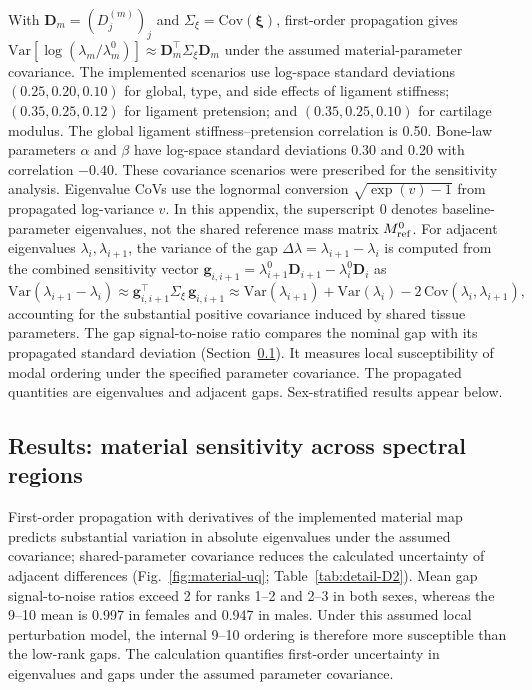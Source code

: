 \documentclass[pdflatex,sn-basic]{sn-jnl}
\begin{document}
With $\mathbf D_m=(D_j^{(m)})_j$ and $\Sigma_{\xi}=\mathrm{Cov}(\boldsymbol\xi)$, first-order propagation gives $\mathrm{Var}[\log(\lambda_m/\lambda_m^0)]\approx\mathbf D_m^\top\Sigma_{\xi}\mathbf D_m$ under the assumed material-parameter covariance. The implemented scenarios use log-space standard deviations $(0.25,0.20,0.10)$ for global, type, and side effects of ligament stiffness; $(0.35,0.25,0.12)$ for ligament pretension; and $(0.35,0.25,0.10)$ for cartilage modulus. The global ligament stiffness--pretension correlation is 0.50. Bone-law parameters $\alpha$ and $\beta$ have log-space standard deviations 0.30 and 0.20 with correlation $-0.40$. These covariance scenarios were prescribed for the sensitivity analysis. Eigenvalue CoVs use the lognormal conversion $\sqrt{\exp(v)-1}$ from propagated log-variance $v$. In this appendix, the superscript $0$ denotes baseline-parameter eigenvalues, not the shared reference mass matrix $M_{\rm ref}^0$.
For adjacent eigenvalues $\lambda_i, \lambda_{i+1}$, the variance of the gap $\Delta\lambda = \lambda_{i+1}-\lambda_i$ is computed from the combined sensitivity vector $\mathbf g_{i,i+1} = \lambda_{i+1}^0\mathbf D_{i+1} - \lambda_i^0\mathbf D_i$ as
\begin{equation}
\mathrm{Var}(\lambda_{i+1}-\lambda_i) \approx \mathbf g_{i,i+1}^\top \Sigma_{\xi}\,\mathbf g_{i,i+1} \approx \mathrm{Var}(\lambda_{i+1}) + \mathrm{Var}(\lambda_i) - 2\,\mathrm{Cov}(\lambda_i, \lambda_{i+1}),
\label{eq:gap-cov}
\end{equation}
accounting for the substantial positive covariance induced by shared tissue parameters.
The gap signal-to-noise ratio compares the nominal gap with its propagated standard deviation (Section~\ref{sec:uq-results}). It measures local susceptibility of modal ordering under the specified parameter covariance. The propagated quantities are eigenvalues and adjacent gaps. Sex-stratified results appear below.

\subsection{Results: material sensitivity across spectral regions}\label{sec:uq-results}
First-order propagation with derivatives of the implemented material map predicts substantial variation in absolute eigenvalues under the assumed covariance; shared-parameter covariance reduces the calculated uncertainty of adjacent differences (Fig.~\ref{fig:material-uq}; Table~\ref{tab:detail-D2}). Mean gap signal-to-noise ratios exceed 2 for ranks 1--2 and 2--3 in both sexes, whereas the 9--10 mean is 0.997 in females and 0.947 in males. Under this assumed local perturbation model, the internal 9--10 ordering is therefore more susceptible than the low-rank gaps. The calculation quantifies first-order uncertainty in eigenvalues and gaps under the assumed parameter covariance.
\end{document}
